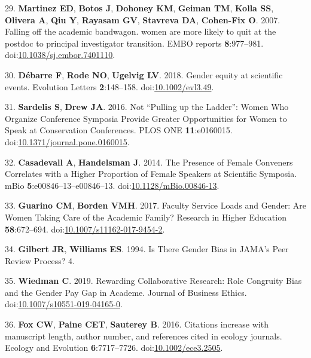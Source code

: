 \documentclass[11pt,]{article}
\begin{document}
\hypertarget{ref-Martinez2007}{}
29. \textbf{Martinez ED}, \textbf{Botos J}, \textbf{Dohoney KM},
\textbf{Geiman TM}, \textbf{Kolla SS}, \textbf{Olivera A}, \textbf{Qiu
Y}, \textbf{Rayasam GV}, \textbf{Stavreva DA}, \textbf{Cohen-Fix O}.
2007. Falling off the academic bandwagon. women are more likely to quit
at the postdoc to principal investigator transition. EMBO reports
\textbf{8}:977--981.
doi:\href{https://doi.org/10.1038/sj.embor.7401110}{10.1038/sj.embor.7401110}.

\hypertarget{ref-debarre_gender_2018}{}
30. \textbf{Débarre F}, \textbf{Rode NO}, \textbf{Ugelvig LV}. 2018.
Gender equity at scientific events. Evolution Letters
\textbf{2}:148--158.
doi:\href{https://doi.org/10.1002/evl3.49}{10.1002/evl3.49}.

\hypertarget{ref-sardelis_not_2016}{}
31. \textbf{Sardelis S}, \textbf{Drew JA}. 2016. Not ``Pulling up the
Ladder'': Women Who Organize Conference Symposia Provide Greater
Opportunities for Women to Speak at Conservation Conferences. PLOS ONE
\textbf{11}:e0160015.
doi:\href{https://doi.org/10.1371/journal.pone.0160015}{10.1371/journal.pone.0160015}.

\hypertarget{ref-casadevall_presence_2014}{}
32. \textbf{Casadevall A}, \textbf{Handelsman J}. 2014. The Presence of
Female Conveners Correlates with a Higher Proportion of Female Speakers
at Scientific Symposia. mBio \textbf{5}:e00846--13--e00846--13.
doi:\href{https://doi.org/10.1128/mBio.00846-13}{10.1128/mBio.00846-13}.

\hypertarget{ref-guarino_faculty_2017}{}
33. \textbf{Guarino CM}, \textbf{Borden VMH}. 2017. Faculty Service
Loads and Gender: Are Women Taking Care of the Academic Family? Research
in Higher Education \textbf{58}:672--694.
doi:\href{https://doi.org/10.1007/s11162-017-9454-2}{10.1007/s11162-017-9454-2}.

\hypertarget{ref-gilbert_is_1994}{}
34. \textbf{Gilbert JR}, \textbf{Williams ES}. 1994. Is There Gender
Bias in JAMA's Peer Review Process? 4.

\hypertarget{ref-wiedman_rewarding_2019}{}
35. \textbf{Wiedman C}. 2019. Rewarding Collaborative Research: Role
Congruity Bias and the Gender Pay Gap in Academe. Journal of Business
Ethics.
doi:\href{https://doi.org/10.1007/s10551-019-04165-0}{10.1007/s10551-019-04165-0}.

\hypertarget{ref-fox_citations_2016}{}
36. \textbf{Fox CW}, \textbf{Paine CET}, \textbf{Sauterey B}. 2016.
Citations increase with manuscript length, author number, and references
cited in ecology journals. Ecology and Evolution \textbf{6}:7717--7726.
doi:\href{https://doi.org/10.1002/ece3.2505}{10.1002/ece3.2505}.
\end{document}
